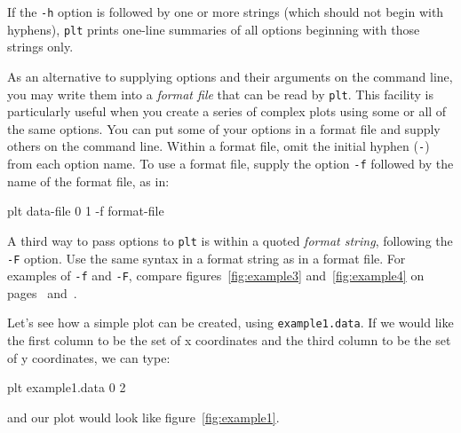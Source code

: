 \documentclass{book}
\begin{document}
If the {\tt -h} option is followed by one or more strings (which should not
begin with hyphens), {\tt plt} prints one-line summaries of all
options beginning with those strings only.

%
As an alternative to supplying options and their arguments on the
command line, you may write them into a {\em format file} that can
be read by {\tt plt}.  This facility is particularly useful when you
create a series of complex plots using some or all of the same
options.  You can put some of your options in a format file and supply
others on the command line.  Within a format file, omit the initial
hyphen ({\tt -}) from each option name.  To use a format file, supply
the option {\tt -f} followed by the name of the format file, as in:

\begin{center}
\begin{boxedverbatim}
plt data-file 0 1 -f format-file
\end{boxedverbatim}
\end{center}

%
A third way to pass options to {\tt plt} is within a quoted {\em format
string}, following the {\tt -F} option.  Use the same syntax in a
format string as in a format file.
For examples of {\tt -f} and {\tt -F}, compare
figures~\ref{fig:example3} and~\ref{fig:example4} on
pages~\pageref{fig:example3} and~\pageref{fig:example4}.

Let's see how a simple plot can be created, using {\tt example1.data}.
If we would like the first column to be the set of x coordinates and the
third column to be the set of y coordinates, we can type:
\begin{center}
\begin{boxedverbatim}
plt example1.data 0 2
\end{boxedverbatim}
\end{center}
and our plot would look like figure~\ref{fig:example1}.
\end{document}
